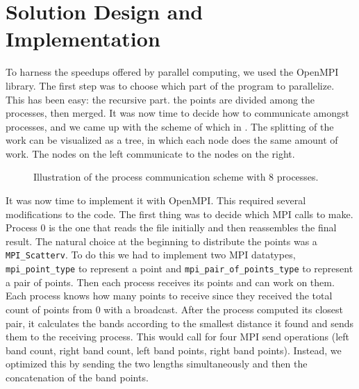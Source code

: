 \section{Solution Design and Implementation}
\label{sec:parallelization}

To harness the speedups offered by parallel computing, we used the OpenMPI library.
The first step was to choose which part of the program to parallelize.
This has been easy: the recursive part.
the points are divided among the processes, then merged.
It was now time to decide how to communicate amongst processes, and we came up with the scheme of which in .
The splitting of the work can be visualized as a tree, in which each node does the same amount of work. The nodes on the left communicate to the nodes on the right.

\begin{figure}[!ht]
  \resizebox{\columnwidth}{!}{
    
  }
  \caption{Illustration of the process communication scheme with 8 processes.}
  \label{fig:albero_bell_albero}
\end{figure}

It was now time to implement it with OpenMPI. This required several modifications to the code. The first thing was to decide which MPI calls to make.
Process 0 is the one that reads the file initially and then reassembles the final result.
The natural choice at the beginning to distribute the points was a \verb+MPI_Scatterv+. To do this we had to implement two MPI datatypes, \verb+mpi_point_type+ to represent a point and \verb+mpi_pair_of_points_type+
to represent a pair of points.
Then each process receives its points and can work on them. Each process knows how many points to receive since they received the total count of points from 0 with a broadcast.
After the process computed its closest pair, it calculates the bands according to the smallest distance it found and sends them to the receiving process.
This would call for four MPI send operations (left band count, right band count, left band points, right band points). Instead, we optimized this by sending the two lengths simultaneously and then the concatenation of the band points.
